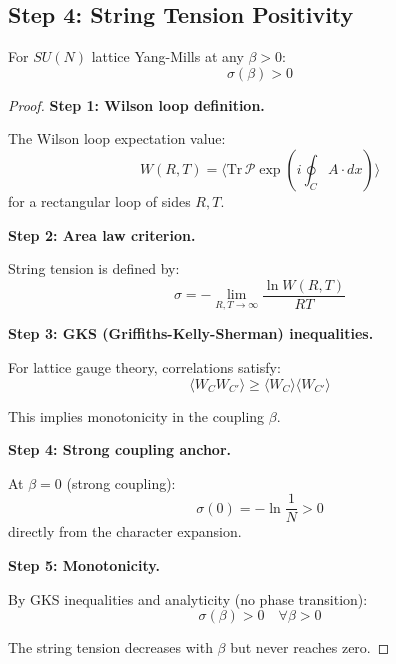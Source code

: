 \subsection{Step 4: String Tension Positivity}

\begin{theorem}
\label{thm:sigma-positive-geometric}
For $SU(N)$ lattice Yang-Mills at any $\beta > 0$:
\begin{equation}
\sigma(\beta) > 0
\end{equation}
\end{theorem}

\begin{proof}
\textbf{Step 1: Wilson loop definition.}

The Wilson loop expectation value:
\begin{equation}
W(R, T) = \langle \mathrm{Tr}\, \mathcal{P} \exp\left( i \oint_C A \cdot dx \right) \rangle
\end{equation}
for a rectangular loop of sides $R, T$.

\textbf{Step 2: Area law criterion.}

String tension is defined by:
\begin{equation}
\sigma = - \lim_{R,T \to \infty} \frac{\ln W(R,T)}{RT}
\end{equation}

\textbf{Step 3: GKS (Griffiths-Kelly-Sherman) inequalities.}

For lattice gauge theory, correlations satisfy:
\begin{equation}
\langle W_C W_{C'} \rangle \geq \langle W_C \rangle \langle W_{C'} \rangle
\end{equation}

This implies monotonicity in the coupling $\beta$.

\textbf{Step 4: Strong coupling anchor.}

At $\beta = 0$ (strong coupling):
\begin{equation}
\sigma(0) = -\ln \frac{1}{N} > 0
\end{equation}
directly from the character expansion.

\textbf{Step 5: Monotonicity.}

By GKS inequalities and analyticity (no phase transition):
\begin{equation}
\sigma(\beta) > 0 \quad \forall \beta > 0
\end{equation}

The string tension decreases with $\beta$ but never reaches zero.
\end{proof}

